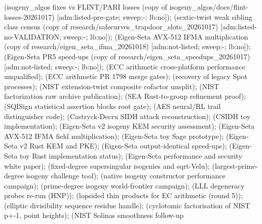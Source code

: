  (isogeny\_\allowbreak{}algos fixes vs FLINT/\allowbreak{}PARI losses (copy of isogeny\_\allowbreak{}algos/\allowbreak{}docs/\allowbreak{}flint-losses-20261017) [adm:listed-pre-gate; sweep:-; lb:no]);  (sextic-twist weak sibling class census (copy of research/\allowbreak{}safecurves\_\allowbreak{}trapdoor\_\allowbreak{}slots\_\allowbreak{}20261017) [adm:listed-no-VALIDATION; sweep:-; lb:no]);  (Eigen-Seta AVX-512 IFMA multiplication (copy of research/\allowbreak{}eigen\_\allowbreak{}seta\_\allowbreak{}ifma\_\allowbreak{}20261018) [adm:not-listed; sweep:-; lb:no]);  (Eigen-Seta PR5 speed-ups (copy of research/\allowbreak{}eigen\_\allowbreak{}seta\_\allowbreak{}speedups\_\allowbreak{}20261017) [adm:not-listed; sweep:-; lb:no]);  (ECC arithmetic cross-platform performance unqualified);  (ECC arithmetic PR 1798 merge gates);  (recovery of legacy Spot processes);  (NIST extension-twist composite cofactor unsplit);  (NIST factorization raw archive publication);  (SEA Rust-to-group refinement proof);  (SQISign statistical assertion blocks root gate);  (AES neural/\allowbreak{}RL trail distinguisher code);  (Castryck-Decru SIDH attack reconstruction);  (CSIDH toy implementation);  (Eigen-Seta v2 isogeny KEM security assessment);  (Eigen-Seta AVX-512 IFMA field multiplication);  (Eigen-Seta toy Sage prototype);  (Eigen-Seta v2 Rust KEM and PKE);  (Eigen-Seta output-identical speed-ups);  (Eigen-Seta toy Rust implementation status);  (Eigen-Seta performance and security white paper);  (fixed-degree supersingular isogenies and sqrt-Velu);  (largest-prime-degree isogeny challenge tool);  (native isogeny constructor performance campaign);  (prime-degree isogeny world-frontier campaign);  (LLL degeneracy probes re-run (HNP));  (lopsided thin products for EC arithmetic (round 5));  (elliptic divisibility sequence residue handle);  (cyclotomic factorisation of NIST p+-1, point heights);  (NIST Solinas smoothness follow-up 